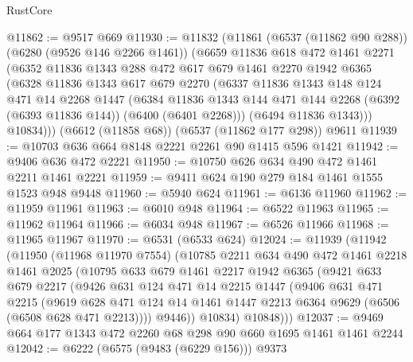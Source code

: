 \begin{lexlean}{RustCore}
\begin{coremodule}
@11862 := @9517 @669
@11930 := @11832
    (@11861
      (@6537 (@11862 @90 @288))
      (@6280 (@9526 @146 @2266 @1461))
      (@6659
        @11836
        @618
        @472
        @1461
        @2271
        (@6352
          @11836
          @1343
          @288
          @472
          @617
          @679
          @1461
          @2270
          @1942
          @6365
          (@6328
            @11836
            @1343
            @617
            @679
            @2270
            (@6337
              @11836
              @1343
              @148
              @124
              @471
              @14
              @2268
              @1447
              (@6384
                @11836
                @1343
                @144
                @471
                @144
                @2268
                (@6392 (@6393 @11836 @144))
                (@6400 (@6401 @2268)))
              (@6494 @11836 @1343)))
          @10834)))
    (@6612 (@11858 @68))
    (@6537 (@11862 @177 @298))
    @9611
@11939 := @10703 @636 @664 @8148 @2221 @2261 @90 @1415 @596 @1421
@11942 := @9406 @636 @472 @2221
@11950 := @10750 @626 @634 @490 @472 @1461 @2211 @1461 @2221
@11959 := @9411 @624 @190 @279 @184 @1461 @1555 @1523 @948 @9448
@11960 := @5940 @624
@11961 := @6136 @11960
@11962 := @11959 @11961
@11963 := @6010 @948
@11964 := @6522 @11963
@11965 := @11962 @11964
@11966 := @6034 @948
@11967 := @6526 @11966
@11968 := @11965 @11967
@11970 := @6531 (@6533 @624)
@12024 := @11939
    (@11942
      (@11950
        (@11968 @11970 @7554)
        (@10785
          @2211
          @634
          @490
          @472
          @1461
          @2218
          @1461
          @2025
          (@10795
            @633
            @679
            @1461
            @2217
            @1942
            @6365
            (@9421
              @633
              @679
              @2217
              (@9426
                @631
                @124
                @471
                @14
                @2215
                @1447
                (@9406
                  @631
                  @471
                  @2215
                  (@9619
                    @628
                    @471
                    @124
                    @14
                    @1461
                    @1447
                    @2213
                    @6364
                    @9629
                    (@6506 (@6508 @628 @471 @2213))))
                @9446))
            @10834)
          @10848)))
@12037 := @9469 @664 @177 @1343 @472 @2260 @68 @298 @90 @660 @1695 @1461 @1461 @2244
@12042 := @6222 (@6575 (@9483 (@6229 @156))) @9373

\end{coremodule}
\end{lexlean}
